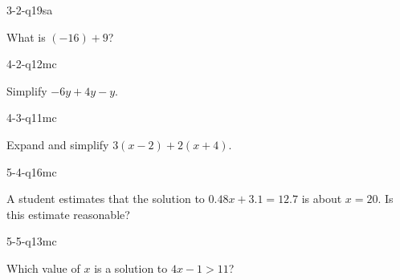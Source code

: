 \begin{practiceQuestion}{3-2-q19}{sa}
\begin{questionText}
What is $(-16) + 9$?
\end{questionText}
\end{practiceQuestion}

\begin{practiceQuestion}{4-2-q12}{mc}
\begin{questionText}
Simplify $-6y + 4y - y$.
\end{questionText}
\end{practiceQuestion}

\begin{practiceQuestion}{4-3-q11}{mc}
\begin{questionText}
Expand and simplify $3(x - 2) + 2(x + 4)$.
\end{questionText}
\end{practiceQuestion}

\begin{practiceQuestion}{5-4-q16}{mc}
\begin{questionText}
A student estimates that the solution to $0.48x + 3.1 = 12.7$ is about $x = 20$. Is this estimate reasonable?
\end{questionText}
\end{practiceQuestion}

\begin{practiceQuestion}{5-5-q13}{mc}
\begin{questionText}
Which value of $x$ is a solution to $4x - 1 > 11$?
\end{questionText}
\end{practiceQuestion}

